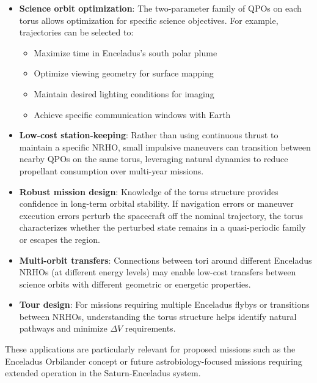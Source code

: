 \documentclass[review,onefignum,onetabnum]{siamart220329}
\begin{document}
\begin{itemize}
    \item \textbf{Science orbit optimization}: The two-parameter family of QPOs
          on each torus allows optimization for specific science objectives.
          For example, trajectories can be selected to:
          \begin{itemize}
              \item Maximize time in Enceladus's south polar plume
              \item Optimize viewing geometry for surface mapping
              \item Maintain desired lighting conditions for imaging
              \item Achieve specific communication windows with Earth
          \end{itemize}

    \item \textbf{Low-cost station-keeping}: Rather than using continuous thrust
          to maintain a specific NRHO, small impulsive maneuvers can transition
          between nearby QPOs on the same torus, leveraging natural dynamics to
          reduce propellant consumption over multi-year missions.

    \item \textbf{Robust mission design}: Knowledge of the torus structure provides
          confidence in long-term orbital stability. If navigation errors or
          maneuver execution errors perturb the spacecraft off the nominal
          trajectory, the torus characterizes whether the perturbed state remains
          in a quasi-periodic family or escapes the region.

    \item \textbf{Multi-orbit transfers}: Connections between tori around different
          Enceladus NRHOs (at different energy levels) may enable low-cost transfers
          between science orbits with different geometric or energetic properties.

    \item \textbf{Tour design}: For missions requiring multiple Enceladus flybys
          or transitions between NRHOs, understanding the torus structure helps
          identify natural pathways and minimize $\Delta V$ requirements.
\end{itemize}

These applications are particularly relevant for proposed missions such as the
Enceladus Orbilander concept or future astrobiology-focused missions requiring
extended operation in the Saturn-Enceladus system.
\end{document}
